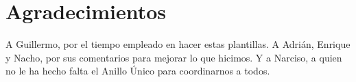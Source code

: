 
\chapter*{Agradecimientos}

A Guillermo, por el tiempo empleado en hacer estas plantillas. A Adrián, Enrique y Nacho, por sus comentarios para mejorar lo que hicimos. Y a Narciso, a quien no le ha hecho falta el Anillo Único para coordinarnos a todos.











